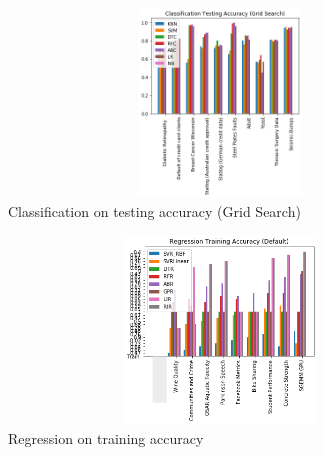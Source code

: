 \documentclass[10pt,twocolumn,letterpaper]{article}
\begin{document}
\begin{figure}
   \begin{center}
   \includegraphics[width=15cm,height=5cm,keepaspectratio]{Classification Testing Accuracy (Grid Search).png}
   \end{center}
      \caption{Classification on testing accuracy (Grid Search)\label{Classification testing accuracy}}
\end{figure}


\begin{figure}
   \begin{center}
   \includegraphics[width=15cm,height=5cm,keepaspectratio]{Regression Training Accuracy (Default).png}
   \end{center}
      \caption{Regression on training accuracy\label{Regression training accuracy}}
\end{figure}
\end{document}
